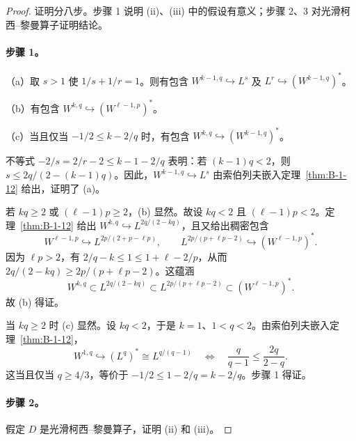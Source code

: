 \begin{proof}
证明分八步。步骤 1 说明 (ii)、(iii) 中的假设有意义；步骤 2、3 对光滑柯西–黎曼算子证明结论。

\paragraph{步骤 1。}（a）取 $s>1$ 使 $1/s+1/r=1$。则有包含 $W^{k-1,q}\hookrightarrow L^s$ 及 $L^r\hookrightarrow(W^{k-1,q})^*$。

（b）有包含 $W^{k,q}\hookrightarrow(W^{\ell-1,p})^*$。

（c）当且仅当 $-1/2\le k-2/q$ 时，有包含 $W^{k,q}\hookrightarrow(W^{k-1,q})^*$。

不等式 $-2/s=2/r-2\le k-1-2/q$ 表明：若 $(k-1)q<2$，则 $s\le2q/(2-(k-1)q)$。因此，$W^{k-1,q}\hookrightarrow L^s$ 由索伯列夫嵌入定理~\ref{thm:B-1-12} 给出，证明了 (a)。

若 $kq\ge2$ 或 $(\ell-1)p\ge2$，(b) 显然。故设 $kq<2$ 且 $(\ell-1)p<2$。定理~\ref{thm:B-1-12} 给出 $W^{k,q}\hookrightarrow L^{2q/(2-kq)}$，且又给出稠密包含
\[
  W^{\ell-1,p}\hookrightarrow L^{2p/(2+p-\ell p)},
  \qquad
  L^{2p/(p+\ell p-2)}\hookrightarrow(W^{\ell-1,p})^*.
\]
因为 $\ell p>2$，有 $2/q-k\le1\le1+\ell-2/p$，从而 $2q/(2-kq)\ge2p/(p+\ell p-2)$。这蕴涵
\[
  W^{k,q}\subset L^{2q/(2-kq)}
  \subset L^{2p/(p+\ell p-2)}
  \subset(W^{\ell-1,p})^*.
\]
故 (b) 得证。

当 $kq\ge2$ 时 (c) 显然。设 $kq<2$，于是 $k=1$、$1<q<2$。由索伯列夫嵌入定理~\ref{thm:B-1-12}，
\[
  W^{1,q}\hookrightarrow(L^q)^*\cong L^{q/(q-1)}
  \quad\Longleftrightarrow\quad
  \frac{q}{q-1}\le\frac{2q}{2-q}.
\]
这当且仅当 $q\ge4/3$，等价于 $-1/2\le1-2/q=k-2/q$。步骤 1 得证。

\paragraph{步骤 2。} 假定 $D$ 是光滑柯西–黎曼算子，证明 (ii) 和 (iii)。


\end{proof}
